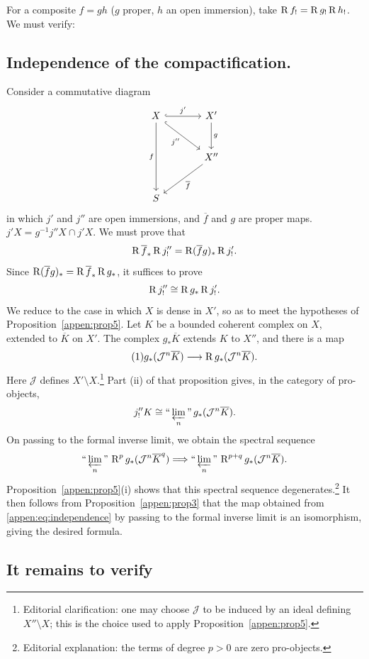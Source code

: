 For a composite $f=gh$ ($g$ proper, $h$ an open immersion), take $\operatorname{R} f_!=\operatorname{R} g_!\operatorname{R} h_!$. We must verify:

\subsection*{Independence of the compactification.}

Consider a commutative diagram
\[
\begin{tikzcd}[row sep=large,column sep=large]
X \ar[r,hook,"j'"] \ar[dr,hook,"j''"'] \ar[dd,"f"']
 & X' \ar[d,"g"] \\
 & X'' \ar[dl,"\overline f"] \\
S
\end{tikzcd}
\]
in which $j'$ and $j''$ are open immersions, and $\overline f$ and $g$
are proper maps. $j'X=g^{-1}j''X\cap j'X$. We must prove that
\[
\operatorname{R}\overline f_*\operatorname{R} j''_!
=\operatorname{R}(\overline f g)_*\operatorname{R} j'_!.
\]
Since $\operatorname{R}(\overline f g)_*=\operatorname{R}\overline f_*\operatorname{R} g_*$, it suffices to prove
\[
\operatorname{R} j''_!\cong\operatorname{R} g_*\operatorname{R} j'_!.
\]
We reduce to the case in which $X$ is dense in $X'$, so as to meet the
hypotheses of Proposition~\ref{appen:prop5}.
Let $K$ be a bounded coherent complex on $X$, extended to $\overline K$
on $X'$. The complex $g_*\overline K$ extends $K$ to $X''$, and there is a map
\begin{equation}\tag{1}\label{appen:eq:independence}
g_*(\mathcal J^n\overline K)\longrightarrow\operatorname{R} g_*(\mathcal J^n\overline K).
\end{equation}
Here $\mathcal J$ defines $X'\setminus X$.\footnote{Editorial clarification: one may choose $\mathcal J$ to be induced by an ideal defining $X''\setminus X$; this is the choice used to apply Proposition~\ref{appen:prop5}.}
Part (ii) of that proposition gives, in the category of pro-objects,
\[
j''_!K\cong\text{``}\varprojlim_n\text{''}\,g_*(\mathcal J^n\overline K).
\]
On passing to the formal inverse limit, we obtain the spectral sequence
\[
\text{``}\varprojlim_n\text{''}\,\operatorname{R}^p g_*(\mathcal J^n\overline K^q)
\Longrightarrow
\text{``}\varprojlim_n\text{''}\,\operatorname{R}^{p+q}g_*(\mathcal J^n\overline K).
\]
Proposition~\ref{appen:prop5}(i) shows that this spectral sequence degenerates.\footnote{Editorial explanation: the terms of degree $p>0$ are zero pro-objects.} It then follows from
Proposition~\ref{appen:prop3} that the map obtained from
\eqref{appen:eq:independence} by passing to the formal inverse limit
is an isomorphism, giving the desired formula.

\subsection*{It remains to verify}

